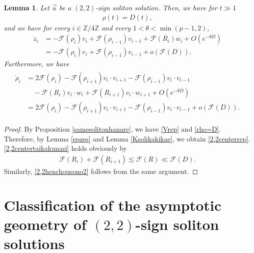 \documentclass[10pt,a4paper]{amsart}
\newtheorem{lemma}[theorem]{Lemma}
\numberwithin{equation}{section}
\begin{document}
\begin{lemma}\label{2,2centerdynamics2}
Let $\vec{u}$ be a $(2,2)$-sign soliton solution. Then, we have for $t\gg 1$
\begin{align}\label{rho=D}
\rho(t)=D(t),
\end{align}
and we have for every $i\in\mathbb{Z}/4\mathbb{Z}$ and every $1<\theta<\min{(p-1,2)}$,
\begin{align}
\dot{z}_i&=-\mathcal{F}(\rho_i)v_i+\mathcal{F}(\rho_{i-1})v_{i-1}+\mathcal{F}(R_i)w_i+O\left(e^{-\theta D}\right) \label{2,2centerrep}
\\
&=-\mathcal{F}(\rho_i)v_i+\mathcal{F}(\rho_{i-1})v_{i-1}+o\left(\mathcal{F}(D)\right). \label{2,2centertaikakunasi}
\end{align}
Furthermore, we have
\begin{align}\label{2,2henchousono2}
\begin{aligned}
\dot{\rho}_i&=2\mathcal{F}(\rho_i)-\mathcal{F}(\rho_{i+1})v_i\cdot v_{i+1}-\mathcal{F}(\rho_{i-1})v_i\cdot v_{i-1}
\\
&\quad-\mathcal{F}(R_i)v_i\cdot w_i+\mathcal{F}(R_{i+1})v_i\cdot w_{i+1}+O\left(e^{-\theta D}\right)
\\
&=2\mathcal{F}(\rho_i)-\mathcal{F}(\rho_{i+1})v_i\cdot v_{i+1}-\mathcal{F}(\rho_{i-1})v_i\cdot v_{i-1}+o\left(\mathcal{F}(D)\right).
\end{aligned}
\end{align}
\end{lemma}
\begin{proof}
By Proposition \ref{samesolitonhanare}, we have \eqref{Vrep} and \eqref{rho=D}. Therefore, by Lemma \ref{epzes} and Lemma \ref{Ksolikakikae}, we obtain \eqref{2,2centerrep}. \eqref{2,2centertaikakunasi} holds obviously by 
\begin{align*}
\mathcal{F}(R_i)+\mathcal{F}(R_{i+1})\lesssim \mathcal{F}(R)\ll \mathcal{F}(D).
\end{align*}
Similarly, \eqref{2,2henchousono2} follows from the same argument.
\end{proof}


\section{Classification of the asymptotic geometry of $(2,2)$-sign soliton solutions}
\end{document}
